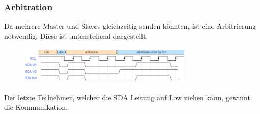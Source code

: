 \subsubsection{Arbitration}
Da mehrere Master und Slaves gleichzeitig senden könnten, ist eine Arbitrierung notwendig. Diese ist untenstehend dargestellt.
\begin{figure}[H]
    \includegraphics[width=0.75\textwidth]{images/i2c_arbitration.png}
\end{figure}
Der letzte Teilnehmer, welcher die SDA Leitung auf Low ziehen kann, gewinnt die Kommunikation.


